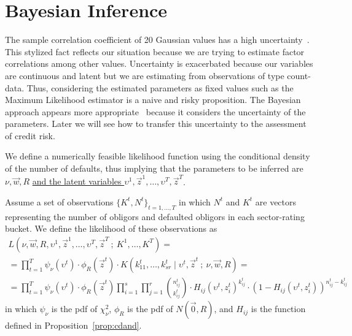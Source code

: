 \documentclass[11pt,fleqn]{book} %
\begin{document}
\section{Bayesian Inference}
\label{sec:binf}

The sample correlation coefficient of 20 Gaussian values has a high 
uncertainty~\cite[pp. 217-221]{kenney:1951}. This stylized fact reflects our 
situation because we are trying to estimate factor correlations among other 
values. Uncertainty is exacerbated because our variables are continuous and 
latent but we are estimating from observations of type count-data. Thus, 
considering the estimated parameters as fixed values such as the Maximum 
Likelihood estimator is a naive and risky proposition. 
The Bayesian approach appears more appropriate~\cite{gossl:2005,tarashev:2010}
because it considers the uncertainty of the parameters. Later we will see 
how to transfer this uncertainty to the assessment of credit risk.

We define a numerically feasible likelihood function using the conditional 
density of the number of defaults, thus implying that the parameters to be 
inferred are $\nu,\vec{w},R$ \ul{and the latent variables 
$\upsilon^1,\vec{z}^1,\dots,\upsilon^T,\vec{z}^T$}.

\begin{definition}
	\label{def:clik}
	Assume a set of observations $\{K^t, N^t\}_{t=1,\dots,T}$ in which $N^t$ 
	and $K^t$ are vectors representing the number of obligors and defaulted 
	obligors in each sector-rating bucket. We define the likelihood of these 
	observations as
	\begin{displaymath}
		\begin{array}{l}
			L(\nu,\vec{w},R,\upsilon^1,\vec{z}^1,\dots,\upsilon^T,\vec{z}^T\ ;\ K^1,\dots,K^T) = \\
			= \displaystyle \prod_{t=1}^T 
			\psi_{\nu}(\upsilon^t) \cdot \phi_{R}(\vec{z}^t) \cdot
			K(k_{11}^t,\dots,k_{sr}^t \mid \upsilon^t,\vec{z}^t\ ;\ \nu,\vec{w},R) = \\
			= \displaystyle
			\prod_{t=1}^T 
			\psi_{\nu}(\upsilon^t) \cdot \phi_{R}(\vec{z}^t)
			\prod_{i=1}^s \prod_{j=1}^r 
			\binom{n_{ij}^t}{k_{ij}^t} \cdot
			H_{ij}(\upsilon^t,z_i^t)^{k_{ij}^t} \cdot
			\left( 1 - H_{ij}(\upsilon^t,z_i^t) \right)^{n_{ij}^t-k_{ij}^t}
		\end{array}
	\end{displaymath}
	in which $\psi_{\nu}$ is the pdf of $\chi_{\nu}^2$, $\phi_{R}$ is the pdf 
	of $N(\vec{0},R)$, and $H_{ij}$ is the function defined in 
	Proposition~\ref{prop:cdand}.
\end{definition}
\end{document}
